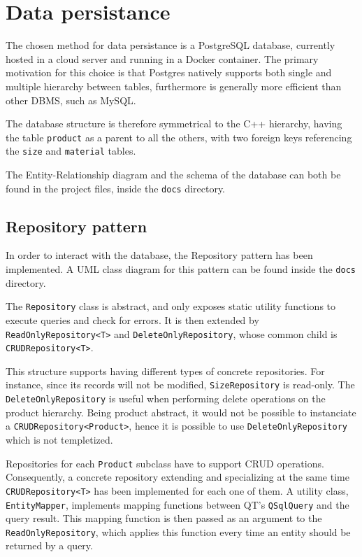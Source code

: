 \documentclass[10pt]{article}
\begin{document}
\section{Data persistance}
The chosen method for data persistance is a PostgreSQL database, currently
hosted in a cloud server and running in a Docker container. The primary
motivation for this choice is that Postgres natively supports both single and
multiple hierarchy between tables, furthermore is generally more efficient than
other DBMS, such as MySQL.

The database structure is therefore symmetrical to the C++ hierarchy, having
the table \texttt{product} as a parent to all the others, with two foreign keys
referencing the \texttt{size} and \texttt{material} tables.

The Entity-Relationship diagram and the schema of the database can both be
found in the project files, inside the \texttt{docs} directory.

\subsection{Repository pattern}
In order to interact with the database, the Repository pattern has been
implemented. A UML class diagram for this pattern can be found inside the
\texttt{docs} directory.

The \texttt{Repository} class is abstract, and only exposes static utility
functions to execute queries and check for errors. It is then extended by
\texttt{ReadOnlyRepository<T>} and \texttt{DeleteOnlyRepository}, whose common
child is \texttt{CRUDRepository<T>}.

This structure supports having different types of concrete repositories. For
instance, since its records will not be modified, \texttt{SizeRepository} is
read-only. The \texttt{DeleteOnlyRepository} is useful when performing delete
operations on the product hierarchy. Being product abstract, it would not be
possible to instanciate a \texttt{CRUDRepository<Product>}, hence it is
possible to use \texttt{DeleteOnlyRepository} which is not templetized.

Repositories for each \texttt{Product} subclass have to support CRUD
operations. Consequently, a concrete repository extending and specializing at
the same time \texttt{CRUDRepository<T>} has been implemented for each one of
them. A utility class, \texttt{EntityMapper}, implements mapping functions
between QT's \texttt{QSqlQuery} and the query result. This mapping function is
then passed as an argument to the \texttt{ReadOnlyRepository}, which applies
this function every time an entity should be returned by a query.
\end{document}
